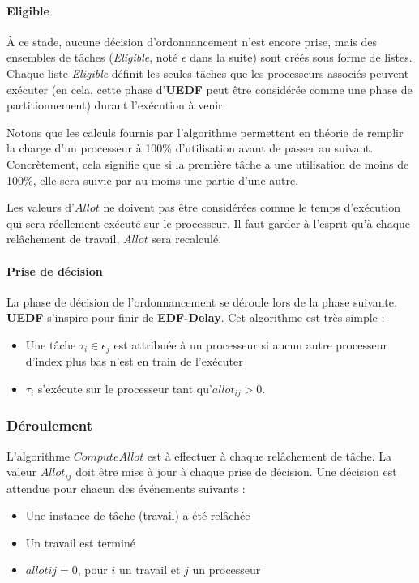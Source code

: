 	\paragraph{Eligible}
	À ce stade, aucune décision d'ordonnancement n'est encore prise, mais des ensembles de tâches (\textit{Eligible}, 
	noté $\epsilon$ dans la suite) sont créés sous forme de listes. Chaque liste \textit{Eligible} définit 
	les seules tâches que les processeurs associés peuvent exécuter (en cela, cette phase d'\textbf{UEDF} peut 
	être considérée comme une phase de partitionnement) durant l'exécution à venir.\newline
	
	Notons que les calculs fournis par l'algorithme permettent en théorie de \og{}remplir\fg{} 
	la charge d'un processeur à 100\% d'utilisation avant de passer au suivant. Concrètement, 
	cela signifie que si la première tâche a une utilisation de moins de 100\%, elle sera suivie par 
	au moins une partie d'une autre.\newline
	
	Les valeurs d'$Allot$ ne doivent pas être considérées comme le temps d'exécution qui sera réellement 
	exécuté sur le processeur. Il faut garder à l'esprit qu'à chaque relâchement de travail, 
	$Allot$ sera recalculé. 

	\paragraph{Prise de décision}
	La phase de décision de l'ordonnancement se déroule lors de la phase suivante.
	\textbf{UEDF} s'inspire pour finir de \textbf{EDF-Delay}. 
	Cet algorithme est très simple :
	\begin{itemize}
		\setlength\itemsep{0.1em}
		\item Une tâche $\tau_i \in \epsilon_j$ est attribuée à un processeur si aucun autre processeur d'index plus bas n'est en train de l'exécuter
		\item $\tau_i$ s'exécute sur le processeur tant qu'$allot_{ij} > 0$.
	\end{itemize}


	\subsubsection{Déroulement}	
	L'algorithme $Compute Allot$ est à effectuer à chaque relâchement de tâche. La valeur $Allot_{ij}$ 
	doit être mise à jour à chaque prise de décision. Une décision est attendue pour chacun des événements suivants :
	\begin{itemize}
		\setlength\itemsep{0.1em}
		\item Une instance de tâche (travail) a été relâchée
		\item Un travail est terminé
		\item $allot{ij} = 0$, pour $i$ un travail et $j$ un processeur 
	\end{itemize}
	
